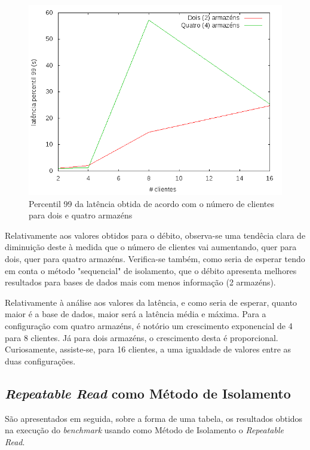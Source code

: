 
\begin{figure}[!h]
\centering
\includegraphics[scale=.4]{img/questao-1/ser-lat-pct99}
\caption{Percentil 99 da latência obtida de acordo com o número de clientes para dois e quatro armazéns}
\end{figure}

Relativamente aos valores obtidos para o débito, observa-se uma tendêcia clara de diminuição deste à medida que o número de clientes vai aumentando, quer para dois, quer para quatro armazéns.
Verifica-se também, como seria de esperar tendo em conta o método "sequencial" de isolamento, que o débito apresenta melhores resultados para bases de dados mais com menos informação (2 armazéns).

Relativamente à análise aos valores da latência, e como seria de esperar, quanto maior é a base de dados, maior será a latência média e máxima.
Para a configuração com quatro armazéns, é notório um crescimento exponencial de 4 para 8 clientes.
Já para dois armazéns, o crescimento desta é proporcional.
Curiosamente, assiste-se, para 16 clientes, a uma igualdade de valores entre as duas configurações.

\newpage

\subsection{\textit{Repeatable Read} como Método de Isolamento}

São apresentados em seguida, sobre a forma de uma tabela, os resultados obtidos na execução do \textit{benchmark} usando como Método de Isolamento o \textit{Repeatable Read}.

